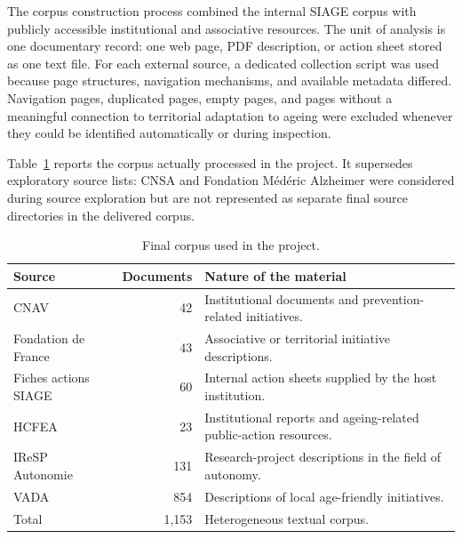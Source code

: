 The corpus construction process combined the internal SIAGE corpus with publicly
accessible institutional and associative resources. The unit of analysis is one
documentary record: one web page, PDF description, or action sheet stored as one
text file. For each external source, a dedicated collection script was used
because page structures, navigation mechanisms, and available metadata differed.
Navigation pages, duplicated pages, empty pages, and pages without a meaningful
connection to territorial adaptation to ageing were excluded whenever they could
be identified automatically or during inspection.

Table~\ref{tab:final-corpus} reports the corpus actually processed in the
project. It supersedes exploratory source lists: CNSA and Fondation Médéric
Alzheimer were considered during source exploration but are not represented as
separate final source directories in the delivered corpus.

\begin{table}[H]
\centering
\begin{tabular}{lrp{7cm}}
\toprule
Source & Documents & Nature of the material \\
\midrule
CNAV & 42 & Institutional documents and prevention-related initiatives. \\
Fondation de France & 43 & Associative or territorial initiative descriptions. \\
Fiches actions SIAGE & 60 & Internal action sheets supplied by the host institution. \\
HCFEA & 23 & Institutional reports and ageing-related public-action resources. \\
IReSP Autonomie & 131 & Research-project descriptions in the field of autonomy. \\
VADA & 854 & Descriptions of local age-friendly initiatives. \\
\midrule
Total & 1,153 & Heterogeneous textual corpus. \\
\bottomrule
\end{tabular}
\caption{Final corpus used in the project.}
\label{tab:final-corpus}
\end{table}

